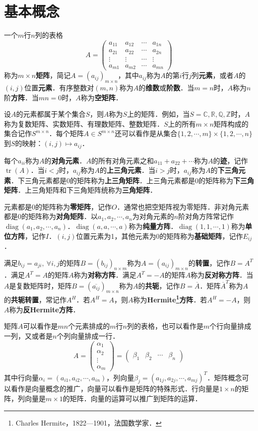 \documentclass[a4paper,fontset=windows]{ctexbook}
\theoremstyle{definition}
\DeclareMathOperator{\diag}{diag}
\DeclareMathOperator{\tr}{tr}
\begin{document}
\section{基本概念}

一个$m$行$n$列的表格
$$A=\begin{pmatrix}a_{11}&a_{12}&\cdots&a_{1n} \\ a_{21}&a_{22}&\cdots&a_{2n} \\ \vdots&\vdots&\cdots&\vdots \\ a_{m1}&a_{m2}&\cdots&a_{mn}\end{pmatrix}$$
称为$m\times n${\bf 矩阵}，简记$A=(a_{ij})_{m\times n}$，其中$a_{ij}$称为$A$的第$i$行$j$列{\bf 元素}，或者$A$的$(i,j)$位置{\bf 元素}．有序整数对$(m,n)$称为$A$的{\bf 维数}或{\bf 阶数}．当$m=n$时，$A$称为$n$阶{\bf 方阵}．当$mn=0$时，$A$称为{\bf 空矩阵}．

设$A$的元素都属于某个集合$S$，则$A$称为$S$上的矩阵．例如，当$S=\mathbb{C},\mathbb{R},\mathbb{Q},\mathbb{Z}$时，$A$称为复数矩阵、实数矩阵、有理数矩阵、整数矩阵．$S$上的所有$m\times n$矩阵构成的集合记作$S^{m\times n}$．每个矩阵$A\in S^{m\times n}$还可以看作是从集合$\{1,2,\cdots,m\}\times\{1,2,\cdots,n\}$到$S$的映射：$(i,j)\mapsto a_{ij}$．

每个$a_{ii}$称为$A$的{\bf 对角元素}．$A$的所有对角元素之和$a_{11}+a_{22}+\cdots$称为$A$的{\bf 迹}，记作$\tr(A)$．当$i<j$时，$a_{ij}$称为$A$的{\bf 上三角元素}．当$i>j$时，$a_{ij}$称为$A$的{\bf 下三角元素}．下三角元素都是0的矩阵称为{\bf 上三角矩阵}．上三角元素都是0的矩阵称为{\bf 下三角矩阵}．上三角矩阵和下三角矩阵统称为{\bf 三角矩阵}．

元素都是0的矩阵称为{\bf 零矩阵}，记作$O$．通常也把空矩阵视为零矩阵．非对角元素都是0的矩阵称为{\bf 对角矩阵}．以$a_1,a_2,\cdots,a_n$为对角元素的$n$阶对角方阵常记作$\diag(a_1,a_2,\cdots,a_n)$．$\diag(a,a,\cdots,a)$称为{\bf 纯量方阵}．$\diag(1,1,\cdots,1)$称为{\bf 单位方阵}，记作$I$．$(i,j)$位置元素为1，其他元素为0的矩阵称为{\bf 基础矩阵}，记作$E_{ij}$．

满足$b_{ij}=a_{ji},~\forall i,j$的矩阵$B=(b_{ij})_{n\times m}$称为$A=(a_{ij})_{m\times n}$的{\bf 转置}，记作$B=A^T$．满足$A^T=A$的矩阵$A$称为{\bf 对称方阵}．满足$A^T=-A$的矩阵$A$称为{\bf 反对称方阵}．当$A$是复数矩阵时，矩阵$B=(\overline{a_{ij}})_{m\times n}$称为$A$的{\bf 共轭}，记作$B=\overline{A}$．矩阵$\overline{A}^T$称为$A$的{\bf 共轭转置}，常记作$A^H$．若$A^H=A$，则$A$称为{\bf Hermite\footnote{Charles Hermite，1822—1901，法国数学家．}方阵}．若$A^H=-A$，则$A$称为{\bf 反Hermite方阵}．

矩阵$A$可以看作是$mn$个元素排成的$m$行$n$列的表格，也可以看作是$m$个行向量排成一列，又或者是$n$个列向量排成一行．
$$A=\begin{pmatrix}\alpha_1\\ \alpha_2\\ \vdots\\ \alpha_m\end{pmatrix}=\begin{pmatrix}\beta_1&\beta_2&\cdots&\beta_n\end{pmatrix}$$
其中行向量$\alpha_i=(a_{i1},a_{i2},\cdots,a_{in})$，列向量$\beta_j=(a_{1j},a_{2j},\cdots,a_{mj})^T$．矩阵概念可以看作是向量概念的推广，向量可以看作是矩阵的特殊形式．行向量是$1\times n$的矩阵，列向量是$m\times 1$的矩阵．向量的运算可以推广到矩阵的运算．
\end{document}

